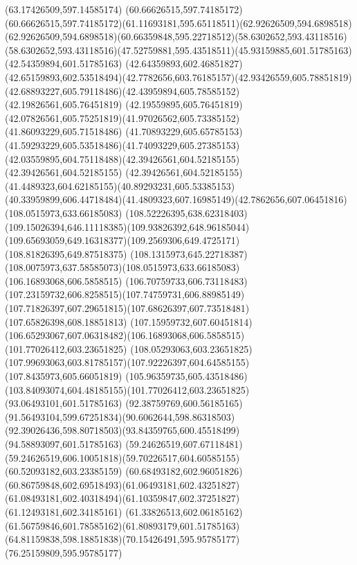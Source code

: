 {{	\lineto(63.17426509,597.14585174)
	\lineto(60.66626515,597.74185172)
	\curveto(60.66626515,597.74185172)(61.11693181,595.65118511)(62.92626509,594.6898518)
	\curveto(62.92626509,594.6898518)(60.66359848,595.22718512)(58.6302652,593.43118516)
	\curveto(58.6302652,593.43118516)(47.52759881,595.43518511)(45.93159885,601.51785163)
	\lineto(42.54359894,601.51785163)
	\lineto(42.64359893,602.46851827)
	\curveto(42.65159893,602.53518494)(42.7782656,603.76185157)(42.93426559,605.78851819)
	\curveto(42.68893227,605.79118486)(42.43959894,605.78585152)(42.19826561,605.76451819)
	\lineto(42.19559895,605.76451819)
	\curveto(42.07826561,605.75251819)(41.97026562,605.73385152)(41.86093229,605.71518486)
	\curveto(41.70893229,605.65785153)(41.59293229,605.53518486)(41.74093229,605.27385153)
	\curveto(42.03559895,604.75118488)(42.39426561,604.52185155)(42.39426561,604.52185155)
	\curveto(42.39426561,604.52185155)(41.4489323,604.62185155)(40.89293231,605.53385153)
	\curveto(40.33959899,606.44718484)(41.4809323,607.16985149)(42.7862656,607.06451816)
	\moveto(108.0515973,633.66185083)
	\curveto(108.52226395,638.62318403)(109.15026394,646.11118385)(109.93826392,648.96185044)
	\curveto(109.65693059,649.16318377)(109.2569306,649.4725171)(108.81826395,649.87518375)
	\curveto(108.1315973,645.22718387)(108.0075973,637.58585073)(108.0515973,633.66185083)
	\moveto(106.16893068,606.5858515)
	\curveto(106.70759733,606.73118483)(107.23159732,606.8258515)(107.74759731,606.88985149)
	\curveto(107.71826397,607.29651815)(107.68626397,607.73518481)(107.65826398,608.18851813)
	\curveto(107.15959732,607.60451814)(106.65293067,607.06318482)(106.16893068,606.5858515)
	\moveto(101.77026412,603.23651825)
	\lineto(108.05293063,603.23651825)
	\curveto(107.99693063,603.81785157)(107.92226397,604.64585155)(107.8435973,605.66051819)
	\curveto(105.96359735,605.43518486)(103.84093074,604.48185155)(101.77026412,603.23651825)
	\moveto(93.06493101,601.51785163)
	\curveto(92.38759769,600.56185165)(91.56493104,599.67251834)(90.6062644,598.86318503)
	\curveto(92.39026436,598.80718503)(93.84359765,600.45518499)(94.58893097,601.51785163)
	\closepath
	\moveto(59.24626519,607.67118481)
	\curveto(59.24626519,606.10051818)(59.70226517,604.60585155)(60.52093182,603.23385159)
	\curveto(60.68493182,602.96051826)(60.86759848,602.69518493)(61.06493181,602.43251827)
	\curveto(61.08493181,602.40318494)(61.10359847,602.37251827)(61.12493181,602.34185161)
	\curveto(61.33826513,602.06185162)(61.56759846,601.78585162)(61.80893179,601.51785163)
	\curveto(64.81159838,598.18851838)(70.15426491,595.95785177)(76.25159809,595.95785177)
}}
